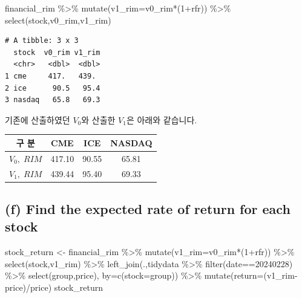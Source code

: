 \documentclass[
  a4paper,
  DIV=11,
  numbers=noendperiod]{scrreprt}
\newenvironment{Shaded}{\begin{snugshade}}{\end{snugshade}}
\newcommand{\AttributeTok}[1]{\textcolor[rgb]{0.40,0.45,0.13}{#1}}
\newcommand{\DecValTok}[1]{\textcolor[rgb]{0.68,0.00,0.00}{#1}}
\newcommand{\FunctionTok}[1]{\textcolor[rgb]{0.28,0.35,0.67}{#1}}
\newcommand{\NormalTok}[1]{\textcolor[rgb]{0.00,0.23,0.31}{#1}}
\newcommand{\OtherTok}[1]{\textcolor[rgb]{0.00,0.23,0.31}{#1}}
\newcommand{\SpecialCharTok}[1]{\textcolor[rgb]{0.37,0.37,0.37}{#1}}
\newcommand{\StringTok}[1]{\textcolor[rgb]{0.13,0.47,0.30}{#1}}
\begin{document}
\begin{Shaded}
\begin{Highlighting}[]
\NormalTok{financial\_rim }\SpecialCharTok{\%\textgreater{}\%} 
  \FunctionTok{mutate}\NormalTok{(}\AttributeTok{v1\_rim=}\NormalTok{v0\_rim}\SpecialCharTok{*}\NormalTok{(}\DecValTok{1}\SpecialCharTok{+}\NormalTok{rfr)) }\SpecialCharTok{\%\textgreater{}\%} 
  \FunctionTok{select}\NormalTok{(stock,v0\_rim,v1\_rim)}
\end{Highlighting}
\end{Shaded}

\begin{verbatim}
# A tibble: 3 x 3
  stock  v0_rim v1_rim
  <chr>   <dbl>  <dbl>
1 cme     417.   439. 
2 ice      90.5   95.4
3 nasdaq   65.8   69.3
\end{verbatim}

기존에 산출하였던 \(V_0\)와 산출한 \(V_1\)은 아래와 같습니다.

\begin{longtable}[]{@{}cccc@{}}
\toprule\noalign{}
구 분 & CME & ICE & NASDAQ \\
\midrule\noalign{}
\endhead
\bottomrule\noalign{}
\endlastfoot
\(V_0,\; RIM\) & 417.10 & 90.55 & 65.81 \\
\(V_1,\; RIM\) & 439.44 & 95.40 & 69.33 \\
\end{longtable}

\subsection*{(f) Find the expected rate of return for each
stock}\label{f-find-the-expected-rate-of-return-for-each-stock}

\begin{Shaded}
\begin{Highlighting}[]
\NormalTok{stock\_return }\OtherTok{\textless{}{-}}\NormalTok{ financial\_rim }\SpecialCharTok{\%\textgreater{}\%} 
  \FunctionTok{mutate}\NormalTok{(}\AttributeTok{v1\_rim=}\NormalTok{v0\_rim}\SpecialCharTok{*}\NormalTok{(}\DecValTok{1}\SpecialCharTok{+}\NormalTok{rfr)) }\SpecialCharTok{\%\textgreater{}\%} 
  \FunctionTok{select}\NormalTok{(stock,v1\_rim) }\SpecialCharTok{\%\textgreater{}\%} 
  \FunctionTok{left\_join}\NormalTok{(.,tidydata }\SpecialCharTok{\%\textgreater{}\%} \FunctionTok{filter}\NormalTok{(date}\SpecialCharTok{==}\DecValTok{20240228}\NormalTok{) }\SpecialCharTok{\%\textgreater{}\%} \FunctionTok{select}\NormalTok{(group,price),}
            \AttributeTok{by=}\FunctionTok{c}\NormalTok{(}\StringTok{\textquotesingle{}stock\textquotesingle{}}\OtherTok{=}\StringTok{\textquotesingle{}group\textquotesingle{}}\NormalTok{)) }\SpecialCharTok{\%\textgreater{}\%} 
  \FunctionTok{mutate}\NormalTok{(}\AttributeTok{return=}\NormalTok{(v1\_rim}\SpecialCharTok{{-}}\NormalTok{price)}\SpecialCharTok{/}\NormalTok{price)}
\NormalTok{stock\_return}
\end{Highlighting}
\end{Shaded}
\end{document}
